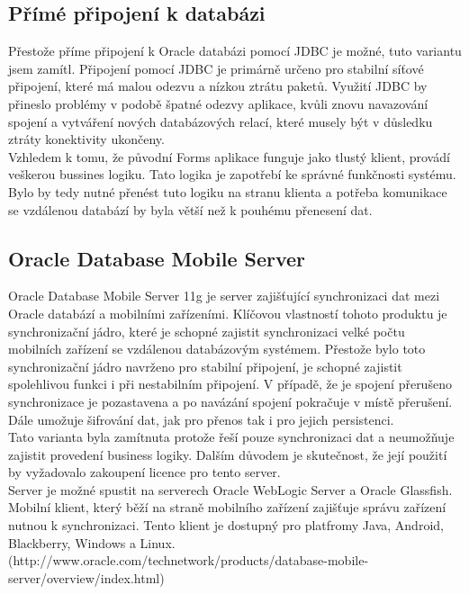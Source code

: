 \documentclass{diplomka}
\begin{document}
\subsection{Přímé připojení k databázi}
Přestože příme připojení k Oracle databázi pomocí JDBC je možné, tuto variantu jsem zamítl. Připojení pomocí JDBC je primárně určeno pro stabilní síťové připojení, které má malou odezvu a nízkou ztrátu paketů. Využití JDBC by přineslo problémy v podobě špatné odezvy aplikace, kvůli znovu navazování spojení a vytváření nových databázových relací, které musely být v důsledku ztráty konektivity ukončeny.\\ \indent
Vzhledem k tomu, že původní Forms aplikace funguje jako tlustý klient, provádí veškerou bussines logiku. Tato logika je zapotřebí ke správné funkčnosti systému. Bylo by tedy nutné přenést tuto logiku na stranu klienta a potřeba komunikace se vzdálenou databází by byla větší než k pouhému přenesení dat.

\subsection{Oracle Database Mobile Server}
Oracle Database Mobile Server 11g je server zajišťující  synchronizaci dat mezi Oracle databází a mobilními zařízeními. Klíčovou vlastností tohoto produktu je synchronizační jádro, které je schopné zajistit synchronizaci velké počtu mobilních zařízení se vzdálenou databázovým systémem. Přestože bylo toto synchronizační jádro navrženo pro stabilní připojení, je schopné zajistit spolehlivou funkci i při nestabilním připojení. V případě, že je spojení přerušeno synchronizace je pozastavena a po navázání spojení pokračuje v místě přerušení. Dále umožuje šifrování dat, jak pro přenos tak i pro jejich persistenci.\\ \indent
Tato varianta byla zamítnuta protože řeší pouze synchronizaci dat a neumožňuje zajistit provedení business logiky. Dalším důvodem je skutečnost, že její použití by vyžadovalo zakoupení licence pro tento server.\\ \indent
Server je možné spustit na serverech Oracle WebLogic Server a Oracle Glassfish. Mobilní klient, který běží na straně mobilního zařízení zajišťuje správu zařízení nutnou k synchronizaci. Tento klient je dostupný pro platfromy Java, Android, Blackberry, Windows a Linux.
(http://www.oracle.com/technetwork/products/database-mobile-server/overview/index.html)
\end{document}
